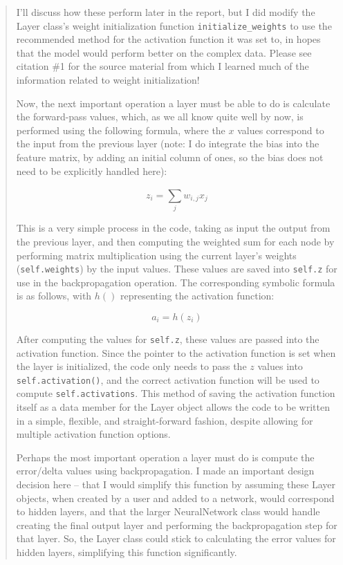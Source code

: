 \documentclass{article}
\begin{document}
\begin{quote}
I'll discuss how these perform later in the report, but I did modify the Layer class's weight initialization  function \texttt{initialize\_weights} to use the recommended method for the activation function it was set to, in hopes that the model would perform better on the complex data. Please see citation \#1 for the source material from which I learned much of the information related to weight initialization!

Now, the next important operation a layer must be able to do is calculate the forward-pass values, which, as we all know quite well by now, is performed using the following formula, where the $x$ values correspond to the input from the previous layer (note: I do integrate the bias into the feature matrix, by adding an initial column of ones, so the bias does not need to be explicitly handled here):

$$z_i = \sum_{j}^{} w_{i,j}x_j$$ 

 This is a very simple process in the code, taking as input the output from the previous layer, and then computing the weighted sum for each node by performing matrix multiplication using the current layer's weights (\texttt{self.weights}) by the input values. These values are saved into \texttt{self.z} for use in the backpropagation operation. The corresponding symbolic formula is as follows, with $h()$ representing the activation function:
 
 $$a_i = h(z_i)$$
 
 After computing the values for \texttt{self.z}, these values are passed into the activation function. Since the pointer to the activation function is set when the layer is initialized, the code only needs to pass the $z$ values into \texttt{self.activation()}, and the correct activation function will be used to compute \texttt{self.activations}. This method of saving the activation function itself as a data member for the Layer object allows the code to be written in a simple, flexible, and straight-forward fashion, despite allowing for multiple activation function options. 
 
 Perhaps the most important operation a layer must do is compute the error/delta values using backpropagation. I made an important design decision here -- that I would simplify this function by assuming these Layer objects, when created by a user and added to a network, would correspond to hidden layers, and that the larger NeuralNetwork class would handle creating the final output layer and performing the backpropagation step for that layer. So, the Layer class could stick to calculating the error values for hidden layers, simplifying this function significantly. 
 

\end{quote}
\end{document}
